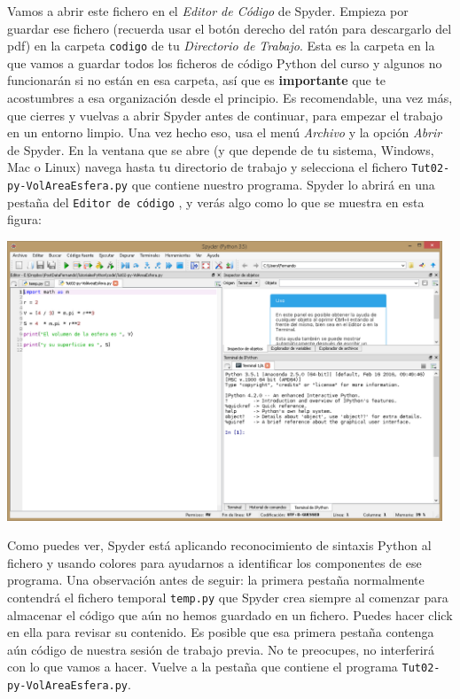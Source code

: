 \documentclass[10pt,a4paper]{article}\usepackage[]{graphicx}\usepackage[]{color}
\newcounter {cont01}
\begin{document}
Vamos a abrir este fichero en el {\em Editor de Código} de Spyder. Empieza por guardar ese fichero (recuerda usar el botón derecho del ratón para descargarlo del pdf) en la carpeta {\tt codigo} de tu {\em Directorio de Trabajo}. Esta es la carpeta en la que vamos a guardar todos los ficheros de código Python del curso y algunos no funcionarán si no están en esa carpeta, así que es {\bf importante} que te acostumbres a esa organización desde el principio. Es recomendable, una vez más, que cierres y vuelvas a abrir Spyder antes de continuar, para empezar el trabajo en un entorno limpio. Una vez hecho eso, usa el menú {\em Archivo} y la opción {\em Abrir} de Spyder. En la ventana que se abre (y que depende de tu sistema, Windows, Mac o Linux) navega hasta tu directorio de trabajo y selecciona el fichero {\tt Tut02-py-VolAreaEsfera.py} que contiene nuestro programa. Spyder lo abrirá en una pestaña del {\tt Editor de código} , y verás algo como lo que se muestra en esta figura:
\begin{center}
\includegraphics[width=13cm]{../fig/Tut-02-py-25-FicheroEnEditorSpyder.png}
\end{center}
Como puedes ver, Spyder está aplicando reconocimiento de sintaxis Python al fichero y usando colores para ayudarnos a identificar los componentes de ese programa. Una observación antes de seguir: la primera pestaña normalmente contendrá el fichero temporal {\tt temp.py} que Spyder crea siempre al comenzar para almacenar el código que aún no hemos guardado en un fichero. Puedes hacer click en ella para revisar su contenido. Es posible que esa primera pestaña contenga aún código de nuestra sesión de trabajo previa. No te preocupes, no interferirá con lo que vamos a hacer. Vuelve a la pestaña que contiene el programa {\tt Tut02-py-VolAreaEsfera.py}.
\end{document}
